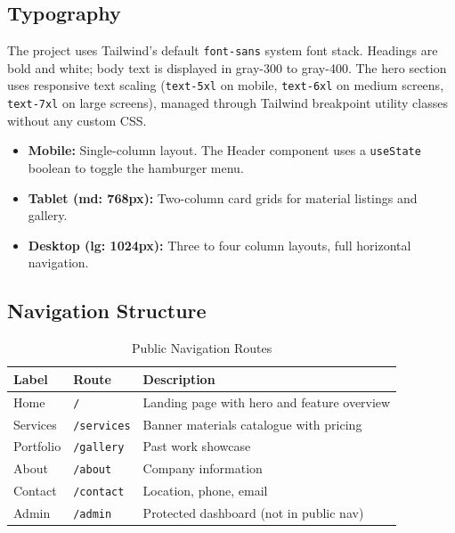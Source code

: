 \documentclass[12pt, a4paper]{article}
\begin{document}
\subsection{Typography}

The project uses Tailwind's default \texttt{font-sans} system font stack. Headings are bold and white; body text is displayed in gray-300 to gray-400. The hero section uses responsive text scaling (\texttt{text-5xl} on mobile, \texttt{text-6xl} on medium screens, \texttt{text-7xl} on large screens), managed through Tailwind breakpoint utility classes without any custom CSS.

\begin{itemize}[noitemsep]
  \item \textbf{Mobile:} Single-column layout. The Header component uses a \texttt{useState} boolean to toggle the hamburger menu.
  \item \textbf{Tablet (md: 768px):} Two-column card grids for material listings and gallery.
  \item \textbf{Desktop (lg: 1024px):} Three to four column layouts, full horizontal navigation.
\end{itemize}

\subsection{Navigation Structure}

\begin{table}[H]
\centering
\caption{Public Navigation Routes}
\begin{tabularx}{\textwidth}{llX}
\toprule
\textbf{Label} & \textbf{Route} & \textbf{Description} \\
\midrule
Home       & \texttt{/}         & Landing page with hero and feature overview \\
Services   & \texttt{/services} & Banner materials catalogue with pricing \\
Portfolio  & \texttt{/gallery}  & Past work showcase \\
About      & \texttt{/about}    & Company information \\
Contact    & \texttt{/contact}  & Location, phone, email \\
Admin      & \texttt{/admin}    & Protected dashboard (not in public nav) \\
\bottomrule
\end{tabularx}
\end{table}

\end{document}
